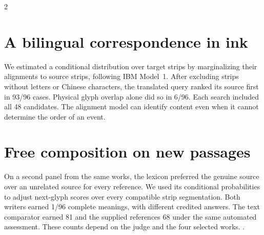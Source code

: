 \begin{multicols}{2}
\section*{A bilingual correspondence in ink}
We estimated a conditional distribution over target strips by marginalizing their alignments to source strips, following IBM Model~1.\cite{brown} After excluding strips without letters or Chinese characters, the translated query ranked its source first in 93/96 cases. Physical glyph overlap alone did so in 6/96. Each search included all 48 candidates. The alignment model can identify content even when it cannot determine the order of an event.
\section*{Free composition on new passages}
On a second panel from the same works, the lexicon preferred the genuine source over an unrelated source for every reference. We used its conditional probabilities to adjust next-glyph scores over every compatible strip segmentation. Both writers earned 1/96 complete meanings, with different credited answers. The text comparator earned 81 and the supplied references 68 under the same automated assessment. These counts depend on the judge and the four selected works. .
\end{multicols}
